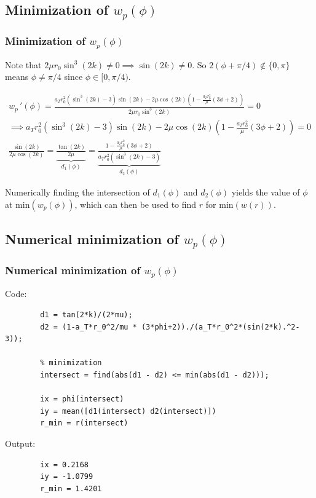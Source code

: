 \documentclass{beamer}
\newcommand{\sectit}[1]{
    \section{\texorpdfstring{#1}{}}
    \frametitle{#1}
}
\begin{document}
\begin{frame}
    \sectit{Minimization of $w_p(\phi)$}

    Note that $2\mu r_0\sin^3(2k)\neq 0\implies \sin(2k)\neq 0$. So $2(\phi+\pi/4)\not\in \{0,\pi\}$ means $\phi\neq \pi/4$ since $\phi\in [0,\pi/4)$.

    {\scriptsize\begin{gather}
        w_p\,'(\phi)=\frac{a_Tr_0^2\left(\sin^3(2k)-3\right)\sin(2k)-2\mu\cos(2k)\left(1-\frac{a_Tr_0^2}{\mu}(3\phi+2)\right)}{2\mu r_0\sin^3(2k)}=0\\
        \implies a_Tr_0^2\left(\sin^3(2k)-3\right)\sin(2k)-2\mu\cos(2k)\left(1-\frac{a_Tr_0^2}{\mu}(3\phi+2)\right)=0\\
        \frac{\sin(2k)}{2\mu\cos(2k)}=\underbrace{\frac{\tan(2k)}{2\mu}}_{d_1(\phi)}=\underbrace{\frac{1-\frac{a_Tr_0^2}{\mu}(3\phi+2)}{a_Tr_0^2(\sin^3(2k)-3)}}_{d_2(\phi)}
    \end{gather}}

    Numerically finding the intersection of $d_1(\phi)$ and $d_2(\phi)$ yields the value of $\phi$ at $\text{min}(w_p(\phi))$, which can then be used to find $r$ for $\text{min}(w(r))$.

\end{frame}

\begin{frame}[fragile]
    \sectit{Numerical minimization of $w_p(\phi)$}

    Code:
    {\scriptsize\begin{verbatim}
        d1 = tan(2*k)/(2*mu);
        d2 = (1-a_T*r_0^2/mu * (3*phi+2))./(a_T*r_0^2*(sin(2*k).^2-3));

        % minimization
        intersect = find(abs(d1 - d2) <= min(abs(d1 - d2)));

        ix = phi(intersect)
        iy = mean([d1(intersect) d2(intersect)])
        r_min = r(intersect)
    \end{verbatim}}
    Output:

    \begin{verbatim}
        ix = 0.2168
        iy = -1.0799
        r_min = 1.4201
    \end{verbatim}

\end{frame}
\end{document}
